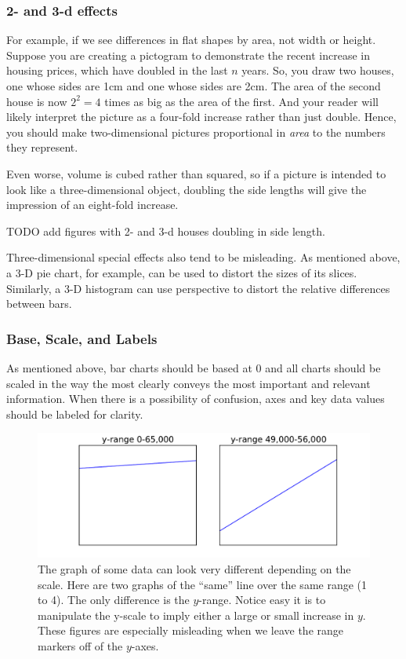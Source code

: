 \subsubsection*{2- and 3-d effects}
For example, if we see differences in flat shapes by area, not width or height. 
Suppose you are creating a pictogram to demonstrate the recent increase in housing prices, which have doubled in the last $n$ years. 
So, you draw two houses, one whose sides are 1cm and one whose sides are 2cm. 
The area of the second house is now $2^2=4$ times as big as the area of the first. And your reader will likely interpret the picture as a four-fold increase rather than just double. 
Hence, you should make two-dimensional pictures proportional in \emph{area} to the numbers they represent.

Even worse, volume is cubed rather than squared, so if a picture is intended to look like a three-dimensional object, doubling the side lengths will give the impression of an eight-fold increase.

TODO add figures with 2- and 3-d houses doubling in side length.

Three-dimensional special effects also tend to be misleading.  As mentioned above, a 3-D pie chart, for example, can be used to distort the sizes of its slices. 
Similarly, a 3-D histogram can use perspective to distort the relative differences between bars.

\subsubsection*{Base, Scale, and Labels}  

As mentioned above, bar charts should be based at 0 and all charts should be scaled in the way the most clearly conveys the most important and relevant information.  When there is a possibility of confusion, axes and key data values should be labeled for clarity.


\begin{figure}
\centering
\includegraphics[width=\textwidth]{dog_plots.pdf}
\caption{The graph of some data can look very different depending on the scale. 
Here are two graphs of the ``same'' line over the same range (1 to 4). 
The only difference is the $y$-range. Notice easy it is to manipulate the y-scale to imply either a large or small increase in $y$. 
These figures are especially misleading when we leave the range markers off of the $y$-axes.}
\label{fig:dog_plots}
\end{figure}

